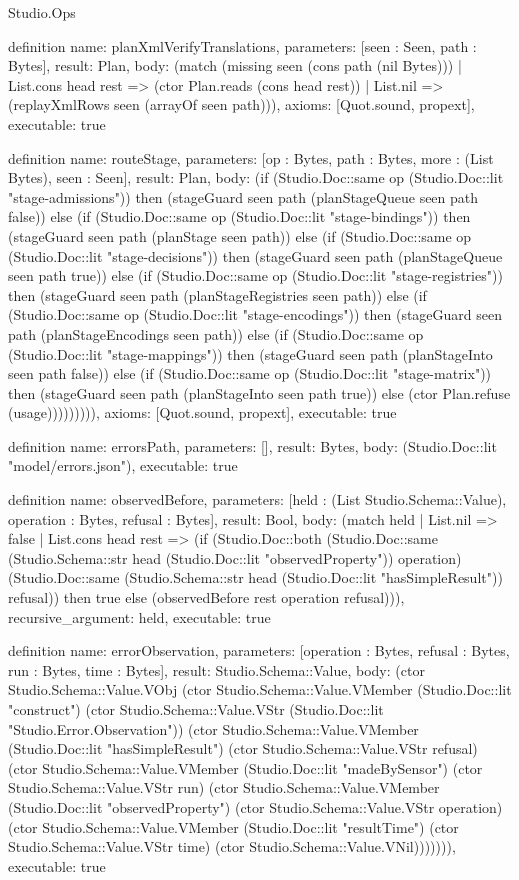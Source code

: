 \begin{lexlean}{Studio.Ops}
\begin{semanticmodule}
{definition{
  name: planXmlVerifyTranslations,
  parameters: [seen : Seen, path : Bytes],
  result: Plan,
  body: (match (missing seen (cons path (nil Bytes)))
    | List.cons head rest => (ctor Plan.reads (cons head rest))
    | List.nil => (replayXmlRows seen (arrayOf seen path))),
  axioms: [Quot.sound, propext],
  executable: true
}


definition{
  name: routeStage,
  parameters: [op : Bytes, path : Bytes, more : (List Bytes), seen : Seen],
  result: Plan,
  body: (if (Studio.Doc::same op (Studio.Doc::lit "stage-admissions")) then (stageGuard seen path (planStageQueue seen path false)) else
    (if (Studio.Doc::same op (Studio.Doc::lit "stage-bindings")) then (stageGuard seen path (planStage seen path)) else
    (if (Studio.Doc::same op (Studio.Doc::lit "stage-decisions")) then (stageGuard seen path (planStageQueue seen path true)) else
    (if (Studio.Doc::same op (Studio.Doc::lit "stage-registries")) then (stageGuard seen path (planStageRegistries seen path)) else
    (if (Studio.Doc::same op (Studio.Doc::lit "stage-encodings")) then (stageGuard seen path (planStageEncodings seen path)) else
    (if (Studio.Doc::same op (Studio.Doc::lit "stage-mappings")) then (stageGuard seen path (planStageInto seen path false)) else
    (if (Studio.Doc::same op (Studio.Doc::lit "stage-matrix")) then (stageGuard seen path (planStageInto seen path true)) else
    (ctor Plan.refuse (usage))))))))),
  axioms: [Quot.sound, propext],
  executable: true
}

definition{
  name: errorsPath,
  parameters: [],
  result: Bytes,
  body: (Studio.Doc::lit "model/errors.json"),
  executable: true
}

definition{
  name: observedBefore,
  parameters: [held : (List Studio.Schema::Value), operation : Bytes, refusal : Bytes],
  result: Bool,
  body: (match held
    | List.nil => false
    | List.cons head rest => (if (Studio.Doc::both (Studio.Doc::same (Studio.Schema::str head (Studio.Doc::lit "observedProperty")) operation) (Studio.Doc::same (Studio.Schema::str head (Studio.Doc::lit "hasSimpleResult")) refusal)) then true else (observedBefore rest operation refusal))),
  recursive_argument: held,
  executable: true
}

definition{
  name: errorObservation,
  parameters: [operation : Bytes, refusal : Bytes, run : Bytes, time : Bytes],
  result: Studio.Schema::Value,
  body: (ctor Studio.Schema::Value.VObj (ctor Studio.Schema::Value.VMember (Studio.Doc::lit "construct") (ctor Studio.Schema::Value.VStr (Studio.Doc::lit "Studio.Error.Observation")) (ctor Studio.Schema::Value.VMember (Studio.Doc::lit "hasSimpleResult") (ctor Studio.Schema::Value.VStr refusal) (ctor Studio.Schema::Value.VMember (Studio.Doc::lit "madeBySensor") (ctor Studio.Schema::Value.VStr run) (ctor Studio.Schema::Value.VMember (Studio.Doc::lit "observedProperty") (ctor Studio.Schema::Value.VStr operation) (ctor Studio.Schema::Value.VMember (Studio.Doc::lit "resultTime") (ctor Studio.Schema::Value.VStr time) (ctor Studio.Schema::Value.VNil))))))),
  executable: true
}

}
\end{semanticmodule}
\end{lexlean}
